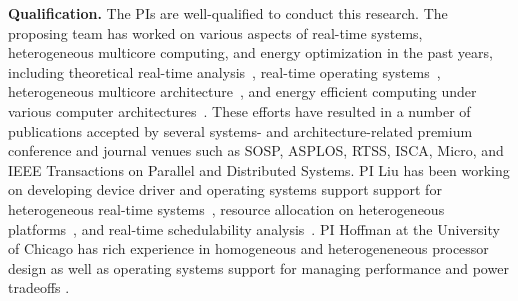 \vspace{2mm} \noindent \textbf{Qualification.} The PIs are well-qualified to conduct this research. The proposing team has worked on various aspects of real-time systems, heterogeneous multicore computing, and energy optimization in the past years, including theoretical real-time analysis~\cite{Liu1, Liu2, Liu6, Liu7, Liu10, liu2014supporting,  Liu3, Liu4, Liu5, Liu9, Liu11, Liu13, chen2015k2u}, real-time operating systems~\cite{elliott1minimizing, Liu12, GPES, zhou2015supporting, Zhou2014a}, heterogeneous multicore architecture~\cite{Zhou2014a, GPES}, and energy efficient computing under various computer architectures~\cite{Liu12}. These efforts have resulted in a number of publications accepted by several systems- and architecture-related premium conference and journal venues such as SOSP, ASPLOS, RTSS, ISCA, Micro, and IEEE Transactions on Parallel and Distributed Systems. 
PI Liu has been working on developing device driver and operating systems support support for heterogeneous real-time systems~\cite{GPES, zhou2015supporting, Zhou2014a},  resource allocation on heterogeneous platforms~\cite{Tong14a, LiuRTSS14a, chen2015k2u, Liu12, elliott1minimizing}, and real-time schedulability analysis~\cite{Liu1, Liu2, Liu6, Liu7, Liu10, liu2014supporting, LiuRTSS14b, Liu3, Liu4, Liu5, Liu9, Liu11, Liu13}.
PI Hoffman at the University of Chicago has rich experience in homogeneous\cite{raw1,raw2,raw3,tilera1,tilera2} and heterogeneneous \cite{ASAP,HPEC,ASAP2,ISSoC} processor design as well as operating systems support for managing performance and power tradeoffs \cite{LEO,POET,DynamicKnobs,JouleGuard,PTRADE,ICAC,TCST,HotPower,CPSNA}.